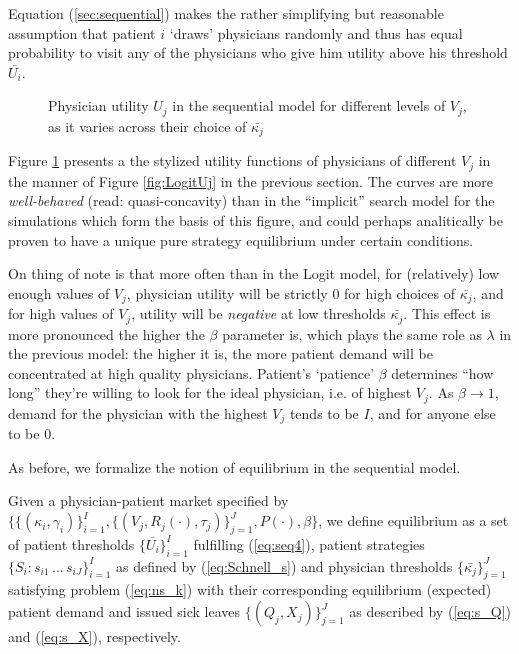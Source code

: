 \documentclass[../main.tex]{subfiles}
\begin{document}
Equation (\ref{sec:sequential}) makes the rather simplifying but reasonable assumption that patient $i$ `draws' physicians randomly and thus has equal probability to visit any of the physicians who give him utility above his threshold $\bar{U_i}$.

\vspace{-3em}

\begin{figure}[H]
    \centering
    \begin{tikzpicture}[scale=0.6]
    
    \end{tikzpicture}
    \caption{Physician utility $U_j$ in the sequential model for different levels of $V_j$,\\ as it varies across their choice of $\bar{\kappa_j}$}
    \label{fig:SchnellUj}
\end{figure}

Figure \ref{fig:SchnellUj} presents a the stylized utility functions of physicians of different $V_j$ in the manner of Figure \ref{fig:LogitUj} in the previous section. The curves are more \textit{well-behaved} (read: quasi-concavity) than in the ``implicit'' search model for the simulations which form the basis of this figure, and could perhaps analitically be proven to have a unique pure strategy equilibrium under certain conditions.

On thing of note is that more often than in the Logit model, for (relatively) low enough values of $V_j$, physician utility will be strictly 0 for high choices of $\bar{\kappa_j}$, and for high values of $V_j$, utility will be \textit{negative} at low thresholds $\bar{\kappa_j}$. This effect is more pronounced the higher the $\beta$ parameter is, which plays the same role as $\lambda$ in the previous model: the higher it is, the more patient demand will be concentrated at high quality physicians. Patient's `patience' $\beta$ determines ``how long'' they're willing to look for the ideal physician, i.e. of highest $V_j$. As $\beta \rightarrow 1$, demand for the physician with the highest $V_j$ tends to be $I$, and for anyone else to be 0.

As before, we formalize the notion of equilibrium in the sequential model.

\vspace{0.5em}
\begin{equilibrium}
    \label{Schnell_eq}
Given a physician-patient market specified by $\{\{(\kappa_i,\gamma_i)\}_{i =1}^{I},\{(V_j, R_j(\cdot), \tau_j)\}_{j =1}^{J}, P(\cdot), \beta \}$, we define equilibrium as a set of patient thresholds $\{\bar{U_i}\}_{i =1}^{I}$ fulfilling (\ref{eq:seq4}), patient strategies $\{S_i: s_{i1} \, ... \, s_{iJ}\}_{i =1}^{I}$ as defined by (\ref{eq:Schnell_s}) and physician thresholds $\{\bar{\kappa_j}\}_{j =1}^{J}$ satisfying problem (\ref{eq:ns_k}) with their corresponding equilibrium (expected) patient demand and issued sick leaves $\{(Q_j,X_j)\}_{j =1}^{J}$ as described by (\ref{eq:s_Q}) and (\ref{eq:s_X}), respectively.
\end{equilibrium}
\end{document}

